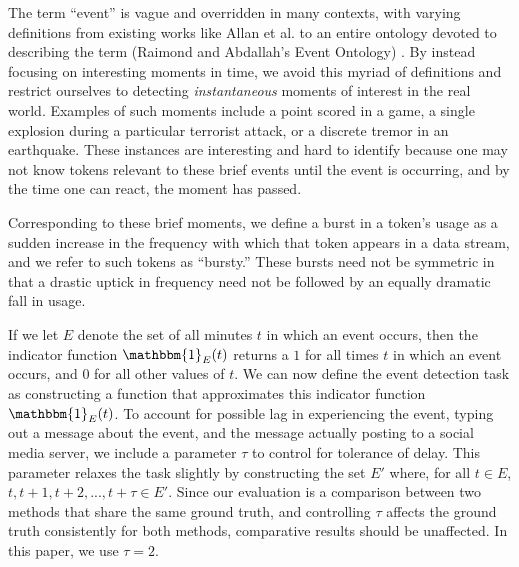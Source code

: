 \documentclass{sig-alternate}
\begin{document}
%
The term ``event'' is vague and overridden in many contexts, with varying definitions from existing works like Allan et al. to an entire ontology devoted to describing the term (Raimond and Abdallah's Event Ontology) \cite{Raimond2007,allan1998line}.
By instead focusing on interesting moments in time, we avoid this myriad of definitions and restrict ourselves to detecting \emph{instantaneous} moments of interest in the real world.
Examples of such moments include a point scored in a game, a single explosion during a particular terrorist attack, or a discrete tremor in an earthquake.
These instances are interesting and hard to identify because one may not know tokens relevant to these brief events until the event is occurring, and by the time one can react, the moment has passed. 

Corresponding to these brief moments, we define a burst in a token's usage as a sudden increase in the frequency with which that token appears in a data stream, and we refer to such tokens as ``bursty.''
These bursts need not be symmetric in that a drastic uptick in frequency need not be followed by an equally dramatic fall in usage.

If we let $E$ denote the set of all minutes $t$ in which an event occurs, then the indicator function $\mathbbm{1}_E(t)$ returns a $1$ for all times $t$ in which an event occurs, and $0$ for all other values of $t$. 
We can now define the event detection task as constructing a function that approximates this indicator function $\mathbbm{1}_E(t)$.
To account for possible lag in experiencing the event, typing out a message about the event, and the message actually posting to a social media server, we include a parameter $\tau$ to control for tolerance of delay.
This parameter relaxes the task slightly by constructing the set $E'$ where, for all $t \in E$, $t, t+1, t+2, ..., t+\tau \in E'$.
Since our evaluation is a comparison between two methods that share the same ground truth, and controlling $\tau$ affects the ground truth consistently for both methods, comparative results should be unaffected.
In this paper, we use $\tau=2$.
\end{document}
